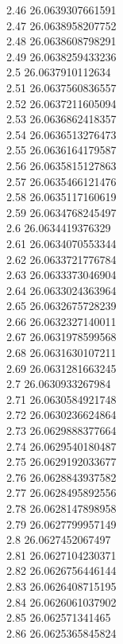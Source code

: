 {2.46	26.0639307661591\\
2.47	26.0638958207752\\
2.48	26.0638608798291\\
2.49	26.0638259433236\\
2.5	26.0637910112634\\
2.51	26.0637560836557\\
2.52	26.0637211605094\\
2.53	26.0636862418357\\
2.54	26.0636513276473\\
2.55	26.0636164179587\\
2.56	26.0635815127863\\
2.57	26.0635466121476\\
2.58	26.0635117160619\\
2.59	26.0634768245497\\
2.6	26.0634419376329\\
2.61	26.0634070553344\\
2.62	26.0633721776784\\
2.63	26.0633373046904\\
2.64	26.0633024363964\\
2.65	26.0632675728239\\
2.66	26.0632327140011\\
2.67	26.0631978599568\\
2.68	26.0631630107211\\
2.69	26.0631281663245\\
2.7	26.0630933267984\\
2.71	26.0630584921748\\
2.72	26.0630236624864\\
2.73	26.0629888377664\\
2.74	26.0629540180487\\
2.75	26.0629192033677\\
2.76	26.0628843937582\\
2.77	26.0628495892556\\
2.78	26.0628147898958\\
2.79	26.0627799957149\\
2.8	26.0627452067497\\
2.81	26.0627104230371\\
2.82	26.0626756446144\\
2.83	26.0626408715195\\
2.84	26.0626061037902\\
2.85	26.062571341465\\
2.86	26.0625365845824\\
}
